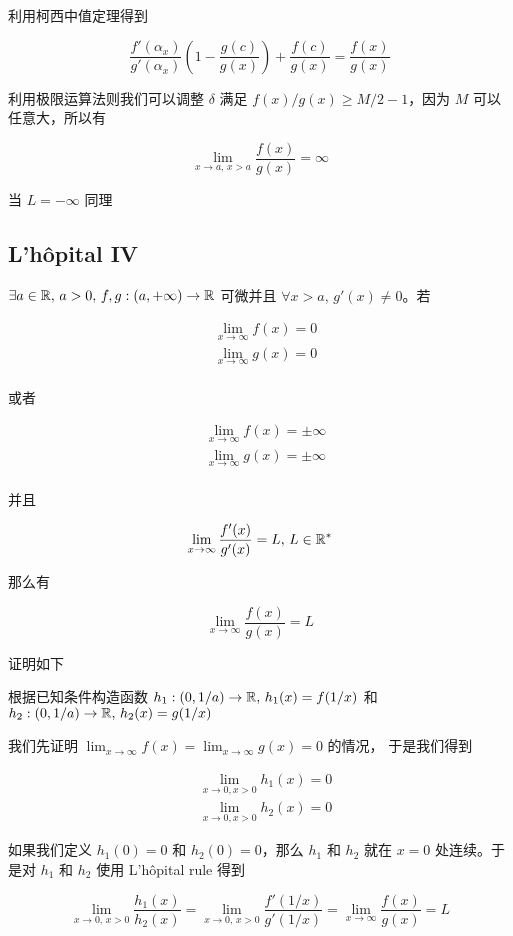 利用柯西中值定理得到

\[
     \frac{f'(\alpha_x)}{g'(\alpha_x)}(1-\frac{g(c)}{g(x)}) + \frac{f(c)}{g(x)}  =  \frac{f(x)}{g(x)}
\]

利用极限运算法则我们可以调整 $\delta$ 满足 $f(x)/g(x) \ge M/2 - 1$，因为 $M$ 可以任意大，所以有

\[
\lim_{x \to a,\, x >a} \frac{f(x)}{g(x)} = \infty
\]

当 $L = -\infty$ 同理

\subsection{L'h\^{o}pital IV}

$\exists a \in \mathbb{R},\,  a > 0,\, f,g: (a, +\infty) \to \mathbb{R}$ 可微并且 $\forall x > a,\, g'(x) \ne 0$。若

\begin{align*}
& \lim_{x \to \infty}f(x) = 0 \\
& \lim_{x \to \infty}g(x) = 0 \\
\end{align*}

或者


\begin{align*}
& \lim_{x \to \infty}f(x) = \pm \infty \\
& \lim_{x \to \infty}g(x) = \pm \infty \\
\end{align*}

并且

\[
 \lim_{x \to \infty}\frac{f'(x)}{g'(x)} =L,\, L \in \mathbb{R}^*
\]

那么有

\[
\lim_{x \to \infty} \frac{f(x)}{g(x)} = L
\]

证明如下

根据已知条件构造函数 $h_1: (0,1/a) \to \mathbb{R},\, h_1(x) = f(1/x)$ 和 $h_2: (0,1/a) \to \mathbb{R},\, h_2(x) = g(1/x)$ 

我们先证明 $\lim_{x \to \infty}f(x) = \lim_{x \to \infty}g(x) = 0$ 的情况， 于是我们得到

\begin{align*}
& \lim_{x \to 0, x >0} h_1(x) = 0  \\
& \lim_{x \to 0, x >0} h_2(x) = 0  
\end{align*}

如果我们定义 $h_1(0) = 0$ 和 $h_2(0) = 0$，那么 $h_1$ 和 $h_2$ 就在 $x=0$ 处连续。于是对 $h_1$ 和 $h_2$ 使用 L'h\^{o}pital rule 得到

\[
\lim_{x \to 0,\, x > 0}\frac{h_1(x)}{h_2(x)} = \lim_{x \to 0,\, x >0}\frac{f'(1/x)}{g'(1/x)} = \lim_{x \to \infty}\frac{f(x)}{g(x)} = L
\]

